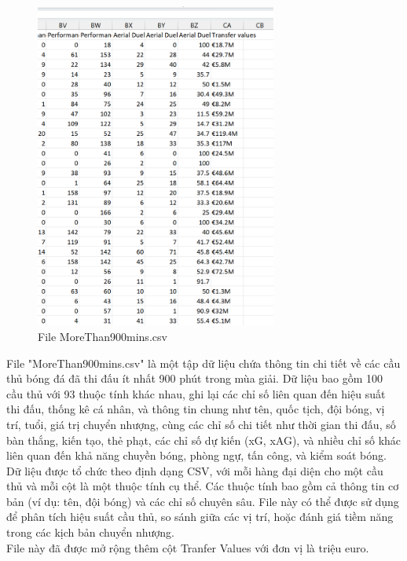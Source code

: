 \documentclass[12pt]{report}
\begin{document}
{\begin{figure}[h]
    \includegraphics[width=300px]{P41_RES.png}
    \caption{File MoreThan900mins.csv}
    \label{fig:res2}
\end{figure}
File "MoreThan900mins.csv" là một tập dữ liệu chứa thông tin chi tiết về các cầu thủ bóng đá đã thi đấu ít nhất 900 phút trong mùa giải. Dữ liệu bao gồm 100 cầu thủ với 93 thuộc tính khác nhau, ghi lại các chỉ số liên quan đến hiệu suất thi đấu, thống kê cá nhân, và thông tin chung như tên, quốc tịch, đội bóng, vị trí, tuổi, giá trị chuyển nhượng, cùng các chỉ số chi tiết như thời gian thi đấu, số bàn thắng, kiến tạo, thẻ phạt, các chỉ số dự kiến (xG, xAG), và nhiều chỉ số khác liên quan đến khả năng chuyền bóng, phòng ngự, tấn công, và kiểm soát bóng.
\\
Dữ liệu được tổ chức theo định dạng CSV, với mỗi hàng đại diện cho một cầu thủ và mỗi cột là một thuộc tính cụ thể. Các thuộc tính bao gồm cả thông tin cơ bản (ví dụ: tên, đội bóng) và các chỉ số chuyên sâu. File này có thể được sử dụng để phân tích hiệu suất cầu thủ, so sánh giữa các vị trí, hoặc đánh giá tiềm năng trong các kịch bản chuyển nhượng.
\\
File này đã được mở rộng thêm cột Tranfer Values với đơn vị là triệu euro.
\clearpage
}
\end{document}
